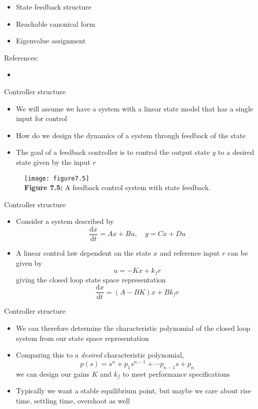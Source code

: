 \documentclass{beamer-control}
\begin{document}

\begin{SUMMARY}
\begin{itemize}
\item State feedback structure
\item Reachable canonical form
\item Eigenvalue assignment
\end{itemize}
\vfill References:
\begin{itemize}
\item {}
\end{itemize}
\end{SUMMARY}




\begin{frame}{Controller structure}
\begin{itemize}
\item We will assume we have a system with a linear state model that has a single input for control
\item How do we design the dynamics of a system through feedback of the state
\item The goal of a feedback controller is to control the output state $y$ to a desired state given by the input $r$
\end{itemize}
\begin{figure}
	\centering
	\texttt{[image: figure7.5]}
	\\
	\textbf{Figure 7.5:} A feedback control system with state feedback.
\end{figure}
\end{frame}


\begin{frame}{Controller structure}
	\begin{itemize}
		\item Consider a system described by
		\[ \frac{\mathrm{d} x}{\mathrm{d} t}=A x+B u, \quad y=C x+D u\]
		\item A linear control law dependent on the state $x$ and reference input $r$ can be given by 
		\[u = -Kx + k_f r\] 
		giving the closed loop state space representation 
		\[\frac{\mathrm{d} x}{\mathrm{d} t} = (A-BK)x + Bk_f r \]
	\end{itemize}
\end{frame}


\begin{frame}{Controller structure}
	\begin{itemize}
		\item We can therefore determine the characteristic polynomial of the closed loop system from our state space representation
		\item Comparing this to a \textit{desired} characteristic polynomial,
		\[p(s) = s^n + p_1 s^{n-1} + \cdots p_{n-1} s + p_n\] 
		we can design our gains $K$ and $k_f$ to meet performance specifications 
		\item Typically we want a stable equilibrium point, but maybe we care about rise time, settling time, overshoot as well 
	\end{itemize}
\end{frame}
\end{document}
